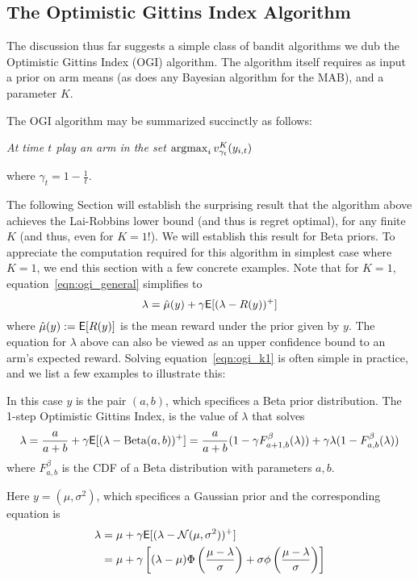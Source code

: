 \subsection{The Optimistic Gittins Index Algorithm}

The discussion thus far suggests a simple class of bandit algorithms we dub the Optimistic Gittins Index (OGI) algorithm. The algorithm itself requires as input a prior on arm means (as does any Bayesian algorithm for the MAB), and a parameter $K$. 


\noindent The OGI algorithm may be summarized succinctly as follows:

\begin{center}
{\em At time $t$ play an arm in the set $\operatorname*{\mathrm{argmax}}_i v^K_{\gamma_t}(y_{i,t})$}
\end{center}

\noindent where $\gamma_t = 1 - \frac{1}{t}$. 

The following Section will establish the surprising result that the algorithm above achieves the Lai-Robbins lower bound (and thus is regret optimal), for any finite $K$ (and thus, even for $K=1$!). We will establish this result for Beta priors. To appreciate the computation required for this algorithm in simplest case where $K=1$, we end this section with a few concrete examples. Note that for $K=1$, equation~\eqref{eqn:ogi_general} simplifies to
\begin{equation} \label{eqn:ogi_k1}
\lambda = \hat \mu(y) + \gamma \mathsf{E}[(\lambda - R(y))^+]
\end{equation}
where $\hat \mu(y) := \mathsf{E}[R(y)]$ is the mean reward under the prior given by $y$. The equation for $\lambda$ above can also be viewed as an upper confidence bound to an arm's expected reward. Solving equation~\eqref{eqn:ogi_k1} is often simple in practice, and we list a few examples to illustrate this:
\begin{example}[Beta]
	In this case $y$ is the pair $(a,b)$, which specifices a Beta prior distribution. The 1-step Optimistic Gittins Index, is the value of $\lambda$ that solves
	\begin{align*}
	\lambda = \frac{a}{a+b} + \gamma \mathsf{E}[(\lambda - {\rm Beta}(a,b))^+] =  \frac{a}{a+b}(1 - \gamma F^\beta_{a+1,b}(\lambda)) + \gamma \lambda (1-F^\beta_{a,b}(\lambda))
	\end{align*}
	where $F^\beta_{a,b}$ is the CDF of a Beta distribution with parameters $a, b$.
\end{example}

\begin{example}[Gaussian]
	Here $y = (\mu,\sigma^2)$, which specifices a Gaussian prior and the corresponding equation is
	\begin{align*}
	\lambda & = \mu  + \gamma \mathsf{E}[(\lambda - {\rm \mathcal{N}}(\mu,\sigma^2))^+]  \\
	& = \mu + \gamma \left[( \lambda - \mu) \Phi\left(\frac{\mu - \lambda}{\sigma}\right) + \sigma\phi\left(\frac{\mu-\lambda}{\sigma}\right) \right]
	\end{align*}
\end{example}

